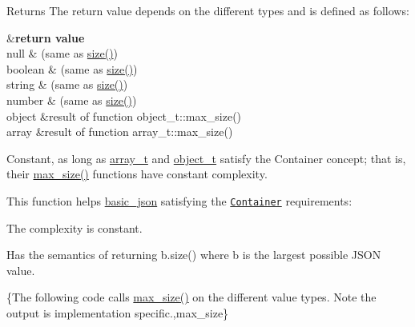\begin{DoxyReturn}{Returns}
The return value depends on the different types and is defined as follows\+: \begin{TabularC}{2}
\hline
{}&{\bf return value  }\\
null &{} (same as {\ttfamily \hyperlink{classnlohmann_1_1basic__json_a01833b332b68d9af1f7cd7a816c39e49}{size()}}) \\
boolean &{} (same as {\ttfamily \hyperlink{classnlohmann_1_1basic__json_a01833b332b68d9af1f7cd7a816c39e49}{size()}}) \\
string &{} (same as {\ttfamily \hyperlink{classnlohmann_1_1basic__json_a01833b332b68d9af1f7cd7a816c39e49}{size()}}) \\
number &{} (same as {\ttfamily \hyperlink{classnlohmann_1_1basic__json_a01833b332b68d9af1f7cd7a816c39e49}{size()}}) \\
object &result of function {\ttfamily object\+\_\+t\+::max\+\_\+size()} \\
array &result of function {\ttfamily array\+\_\+t\+::max\+\_\+size()} \\
\end{TabularC}
Constant, as long as \hyperlink{classnlohmann_1_1basic__json_ab00b882d39306d663c23dab110f5cae0}{array\+\_\+t} and \hyperlink{classnlohmann_1_1basic__json_a0ac9894c9de8dc551cf2e5f1c605537f}{object\+\_\+t} satisfy the Container concept; that is, their {\ttfamily \hyperlink{classnlohmann_1_1basic__json_ad5514a7435f246fc5335856465022a7a}{max\+\_\+size()}} functions have constant complexity.
\end{DoxyReturn}
This function helps {\ttfamily \hyperlink{classnlohmann_1_1basic__json}{basic\+\_\+json}} satisfying the \href{http://en.cppreference.com/w/cpp/concept/Container}{\tt Container} requirements\+:
\begin{DoxyItemize}
\item The complexity is constant.
\item Has the semantics of returning {\ttfamily b.\+size()} where {\ttfamily b} is the largest possible J\+S\+O\+N value.
\end{DoxyItemize}

\{The following code calls {\ttfamily \hyperlink{classnlohmann_1_1basic__json_ad5514a7435f246fc5335856465022a7a}{max\+\_\+size()}} on the different value types. Note the output is implementation specific.,max\+\_\+size\}


